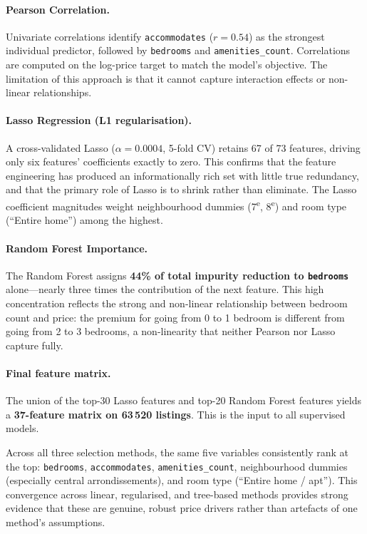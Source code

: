 \documentclass[12pt, a4paper]{article}
\begin{document}
\paragraph{Pearson Correlation.} Univariate correlations identify \texttt{accommodates} ($r = 0.54$) as the strongest individual predictor, followed by \texttt{bedrooms} and \texttt{amenities\_count}. Correlations are computed on the log-price target to match the model's objective. The limitation of this approach is that it cannot capture interaction effects or non-linear relationships.

\paragraph{Lasso Regression (L1 regularisation).} A cross-validated Lasso ($\alpha = 0.0004$, 5-fold CV) retains 67 of 73 features, driving only six features' coefficients exactly to zero. This confirms that the feature engineering has produced an informationally rich set with little true redundancy, and that the primary role of Lasso is to shrink rather than eliminate. The Lasso coefficient magnitudes weight neighbourhood dummies (7\textsuperscript{e}, 8\textsuperscript{e}) and room type (``Entire home'') among the highest.

\paragraph{Random Forest Importance.} The Random Forest assigns \textbf{44\% of total impurity reduction to \texttt{bedrooms}} alone---nearly three times the contribution of the next feature. This high concentration reflects the strong and non-linear relationship between bedroom count and price: the premium for going from 0 to 1 bedroom is different from going from 2 to 3 bedrooms, a non-linearity that neither Pearson nor Lasso capture fully.

\paragraph{Final feature matrix.} The union of the top-30 Lasso features and top-20 Random Forest features yields a \textbf{37-feature matrix on 63\,520 listings}. This is the input to all supervised models.

\begin{insightbox}
Across all three selection methods, the same five variables consistently rank at the top: \texttt{bedrooms}, \texttt{accommodates}, \texttt{amenities\_count}, neighbourhood dummies (especially central arrondissements), and room type (``Entire home / apt''). This convergence across linear, regularised, and tree-based methods provides strong evidence that these are genuine, robust price drivers rather than artefacts of one method's assumptions.
\end{insightbox}
\end{document}
